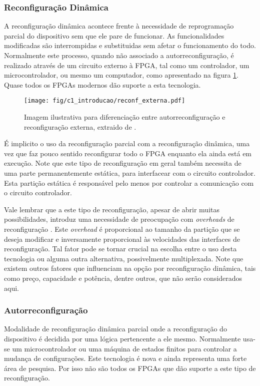 \documentclass[11pt,a4paper,oneside]{book}
\begin{document}
\subsubsection{Reconfigura\c{c}\~ao Din\^amica}
\label{sss:dinamica}
A reconfigura\c{c}\~ao din\^amica acontece frente \`a necessidade de reprograma\c{c}\~ao parcial do dispositivo sem que ele pare de funcionar.
As funcionalidades modificadas s\~ao interrompidas e substituidas sem afetar o funcionamento do todo.
Normalmente este processo, quando n\~ao associado a autorreconfigura\c{c}\~ao, \'e realizado atrav\'es de um circuito externo à FPGA, tal como um controlador, um microcontrolador, ou mesmo um computador, como apresentado na figura \ref{fig:rexterna}.
Quase todos os FPGAs modernos d\~ao suporte a esta tecnologia.

\begin{figure}[htp]
\centering
\texttt{[image: fig/c1\_introducao/reconf\_externa.pdf]}
\caption{Imagem ilustrativa para diferenciação entre autorreconfiguração e reconfiguração externa, extraido de \cite{wp374}.}
\label{fig:rexterna}
\end{figure}

É implicito o uso da reconfiguração parcial com a reconfiguração dinâmica, uma vez que faz pouco sentido reconfigurar todo o FPGA enquanto ela ainda está em execução.
Note que este tipo de reconfiguração em geral também necessita de uma parte permanentemente est\'atica, para interfacear com o circuito controlador.
Esta parti\c{c}\~ao est\'atica \'e respons\'avel pelo menos por controlar a comunica\c{c}\~ao com o circuito controlador.

Vale lembrar que a este tipo de reconfiguração, apesar de abrir muitas possibilidades, introduz uma necessidade de preocupação com \textit{overheads} de reconfiguração \cite{Hauck2007}.
Este \textit{overhead} é proporcional ao tamanho da partição que se deseja modificar e inversamente proporcional às velocidades das interfaces de reconfiguração.
Tal fator pode se tornar crucial na escolha entre o uso desta tecnologia ou alguma outra alternativa, possivelmente multiplexada.
Note que existem outros fatores que influenciam na opção por reconfiguração dinâmica, tais como preço, capacidade e potência, dentre outros, que não serão considerados aqui.

\subsubsection{Autorreconfigura\c{c}\~ao}
Modalidade de reconfigura\c{c}\~ao din\^amica parcial onde a reconfigura\c{c}\~ao do dispositivo \'e decidida por uma l\'ogica pertencente a ele mesmo.
Normalmente usa-se um microcontrolador ou uma m\'aquina de estados finitos para controlar a mudan\c{c}a de configura\c{c}\~oes.
Este tecnologia \'e nova e ainda representa uma forte \'area de pesquisa.
Por isso n\~ao s\~ao todos os FPGAs que d\~ao suporte a este tipo de reconfigura\c{c}\~ao.
\end{document}
